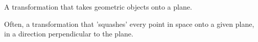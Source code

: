 A transformation that takes geometric objects onto a plane.
\par
Often, a transformation that 'squashes' every point in space 
onto a given plane, in a direction perpendicular to the plane.